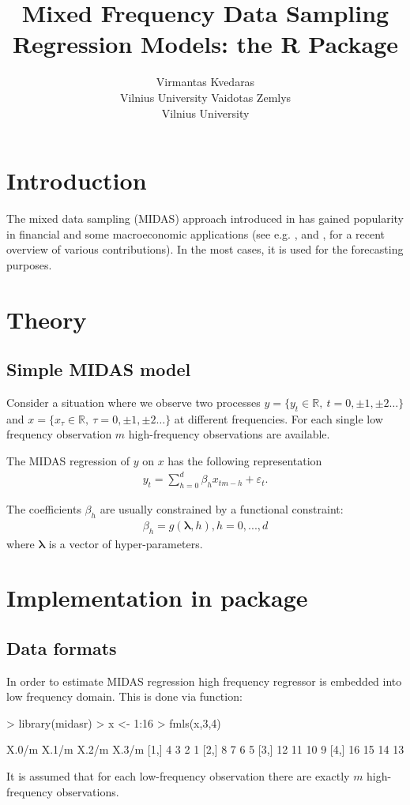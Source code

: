 \documentclass[nojss]{jss}
\author{Virmantas Kvedaras\\Vilnius University \And Vaidotas
  Zemlys\\Vilnius University}
\title{Mixed Frequency Data Sampling Regression Models: the R Package \pkg{midasr}}
\begin{document}
\section{Introduction}

The mixed data sampling (MIDAS) approach introduced in
\cite{ghysels_touch_2002} has gained popularity in financial and some
macroeconomic applications (see e.g. \citealp{foroni:2012}, and
\citealp{sinko:2012}, for a recent overview of various
contributions). In the most cases, it is used for the forecasting purposes.

\section{Theory}

\subsection{Simple MIDAS model}

Consider a situation where we observe two processes $y=\{y_t\in
\mathbb{R}, \ t=0,\pm 1,\pm 2\dots\}$  and $x=\{x_\tau\in \mathbb
  {R}, \ \tau=0, \pm 1, \pm2 \dots\}$ at different frequencies. For
each single low frequency observation $m$ high-frequency observations
are available. 

The MIDAS regression of $y$ on $x$ has the following representation
\begin{align} \label{eq:1}
  y_t=\sum_{h=0}^{d}\beta_hx_{tm-h}+\varepsilon_t. 
\end{align}

The coefficients $\beta_h$ are usually constrained by a functional constraint:
\begin{align*}
  \beta_h=g(\bm{\lambda},h), h=0,...,d
\end{align*}
where $\bm{\lambda}$ is a vector of hyper-parameters.


\section[Implementation in midasr package]{Implementation in  package}

\subsection{Data formats}

In order to estimate MIDAS regression high frequency regressor is
embedded into low frequency domain. This is done via 
function: 
\begin{Schunk}
\begin{Sinput}
> library(midasr)
> x <- 1:16
> fmls(x,3,4)
\end{Sinput}
\begin{Soutput}
     X.0/m X.1/m X.2/m X.3/m
[1,]     4     3     2     1
[2,]     8     7     6     5
[3,]    12    11    10     9
[4,]    16    15    14    13
\end{Soutput}
\end{Schunk}
It is assumed that for each low-frequency observation there are
exactly $m$ high-frequency observations.
\end{document}
